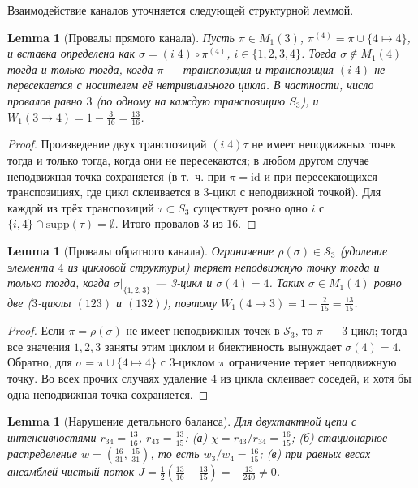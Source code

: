 \documentclass[11pt,a4paper]{article}
\newtheorem{lemma}[theorem]{Lemma}
\newcommand{\S}{\mathcal{S}}
\begin{document}
Взаимодействие каналов уточняется следующей структурной леммой.

\begin{lemma}[Провалы прямого канала]\label{lm:fwd}
Пусть $\pi \in M_1(3)$, $\pi^{(4)} = \pi \cup \{4 \mapsto 4\}$, и вставка
определена как $\sigma = (i\;4) \circ \pi^{(4)}$, $i \in \{1,2,3,4\}$. Тогда
$\sigma \notin M_1(4)$ тогда и только тогда, когда $\pi$ --- транспозиция и
транспозиция $(i\;4)$ не пересекается с носителем её нетривиального цикла.
В частности, число провалов равно $3$ (по одному на каждую транспозицию
$S_3$), и $W_1(3 \to 4) = 1 - \frac{3}{16} = \frac{13}{16}$.
\end{lemma}

\begin{proof}
Произведение двух транспозиций $(i\;4)\tau$ не имеет неподвижных точек тогда и
только тогда, когда они не пересекаются; в любом другом случае неподвижная
точка сохраняется (в т.~ч. при $\pi = \mathrm{id}$ и при пересекающихся
транспозициях, где цикл склеивается в 3-цикл с неподвижной точкой). Для каждой
из трёх транспозиций $\tau \subset S_3$ существует ровно одно $i$ с
$\{i,4\} \cap \mathrm{supp}(\tau) = \emptyset$. Итого провалов $3$ из $16$.
\end{proof}

\begin{lemma}[Провалы обратного канала]\label{lm:bwd}
Ограничение $\rho(\sigma) \in \S_3$ (удаление элемента $4$ из цикловой
структуры) теряет неподвижную точку тогда и только тогда, когда $\sigma|_{\{1,2,3\}}$
--- 3-цикл и $\sigma(4) = 4$. Таких $\sigma \in M_1(4)$ ровно две
($3$-циклы $(123)$ и $(132)$), поэтому
$W_1(4 \to 3) = 1 - \frac{2}{15} = \frac{13}{15}$.
\end{lemma}

\begin{proof}
Если $\pi = \rho(\sigma)$ не имеет неподвижных точек в $\S_3$, то $\pi$ ---
3-цикл; тогда все значения $1,2,3$ заняты этим циклом и биективность вынуждает
$\sigma(4) = 4$. Обратно, для $\sigma = \pi \cup \{4 \mapsto 4\}$ с 3-циклом
$\pi$ ограничение теряет неподвижную точку. Во всех прочих случаях удаление
$4$ из цикла склеивает соседей, и хотя бы одна неподвижная точка сохраняется.
\end{proof}

\begin{lemma}[Нарушение детального баланса]\label{lm:db}
Для двухтактной цепи с интенсивностями $r_{34} = \frac{13}{16}$,
$r_{43} = \frac{13}{15}$: (а) $\chi = r_{43}/r_{34} = \frac{16}{15}$;
(б) стационарное распределение $w = \left(\frac{16}{31},\,\frac{15}{31}\right)$,
то есть $w_3/w_4 = \frac{16}{15}$; (в) при равных весах ансамблей чистый поток
$J = \frac{1}{2}\left(\frac{13}{16} - \frac{13}{15}\right) = -\frac{13}{240} \ne 0$.
\end{lemma}
\end{document}
